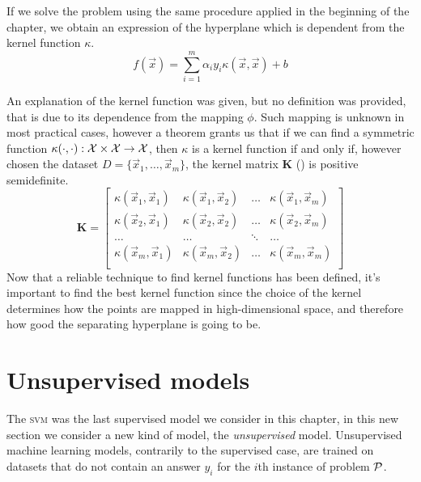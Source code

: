 If we solve the problem using the same procedure applied in the beginning of the chapter, we obtain
an expression of the hyperplane which is dependent from the kernel function $\kappa$.
\begin{equation}
	\label{eq:hd-of}
	f(\vec{x}) = \sum_{i = 1}^m\alpha_iy_i\kappa(\vec{x}, \vec{x}) + b
\end{equation}

An explanation of the kernel function was given, but no definition was provided, that is due to its
dependence from the mapping $\phi$. Such mapping is unknown in most practical cases, however a
theorem \cite{learning-with-kernels} grants us that if we can find a symmetric function
$\kappa(\cdot, \cdot): \mathcal{X} \times \mathcal{X} \rightarrow \mathcal{X}$, then $\kappa$ is a kernel function if and
only if, however chosen the dataset $D = \{\vec{x}_1, \ldots, \vec{x}_m\}$, the kernel matrix
$\mathbf{K}$ () is positive semidefinite.
\begin{equation}
	\label{eq:kernel-matrix}
	\mathbf{K} =
	\begin{bmatrix}
		\kappa(\vec{x}_1, \vec{x}_1) & \kappa(\vec{x}_1, \vec{x}_2) & \ldots &
		\kappa(\vec{x}_1, \vec{x}_m)                                                  \\
		\kappa(\vec{x}_2, \vec{x}_1) & \kappa(\vec{x}_2, \vec{x}_2) & \ldots &
		\kappa(\vec{x}_2, \vec{x}_m)                                                  \\
		\ldots                       & \ldots                       & \ddots & \ldots \\
		\kappa(\vec{x}_m, \vec{x}_1) & \kappa(\vec{x}_m, \vec{x}_2) & \ldots &
		\kappa(\vec{x}_m, \vec{x}_m)                                                  \\
	\end{bmatrix}
\end{equation}
Now that a reliable technique to find kernel functions has been defined, it's important to find the
best kernel function since the choice of the kernel determines how the points are mapped in
high-dimensional space, and therefore how good the separating hyperplane is going to be.

\section{Unsupervised models}
\label{sec:uml}
The \textsc{svm} was the last supervised model we consider in this chapter, in this new section we
consider a new kind of model, the \emph{unsupervised} model. Unsupervised machine learning
models, contrarily to the supervised case, are trained on datasets that do not contain an answer
$y_i$ for the $i$th instance of problem $\mathcal{P}$.

